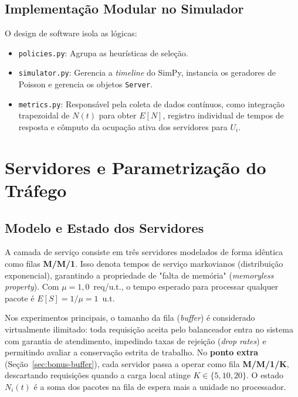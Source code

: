 \documentclass[conference]{IEEEtran}
\begin{document}
\subsection{Implementação Modular no Simulador}

O design de software isola as lógicas:
\begin{itemize}
    \item \texttt{policies.py}: Agrupa as heurísticas de seleção.
    \item \texttt{simulator.py}: Gerencia a \textit{timeline} do SimPy, instancia os geradores de Poisson e gerencia os objetos \texttt{Server}.
    \item \texttt{metrics.py}: Responsável pela coleta de dados contínuos, como integração trapezoidal de $N(t)$ para obter $E[N]$, registro individual de tempos de resposta e cômputo da ocupação ativa dos servidores para $U_i$.
\end{itemize}

\section{Servidores e Parametrização do Tráfego}

\subsection{Modelo e Estado dos Servidores}

A camada de serviço consiste em três servidores modelados de forma idêntica como filas \textbf{M/M/1}. Isso denota tempos de serviço markovianos (distribuição exponencial), garantindo a propriedade de "falta de memória" (\textit{memoryless property}). Com $\mu = 1{,}0$~req/u.t., o tempo esperado para processar qualquer pacote é $E[S] = 1/\mu = 1$~u.t.

Nos experimentos principais, o tamanho da fila (\textit{buffer}) é considerado virtualmente ilimitado: toda requisição aceita pelo balanceador entra no sistema com garantia de atendimento, impedindo taxas de rejeição (\textit{drop rates}) e permitindo avaliar a conservação estrita de trabalho. No \textbf{ponto extra} (Seção~\ref{sec:bonus-buffer}), cada servidor passa a operar como fila \textbf{M/M/1/K}, descartando requisições quando a carga local atinge $K \in \{5, 10, 20\}$. O estado $N_i(t)$ é a soma dos pacotes na fila de espera mais a unidade no processador.
\end{document}
